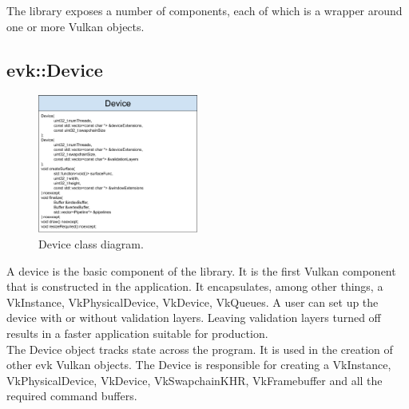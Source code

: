 \documentclass[12pt]{report}
\newcommand{\figurewidth}{0.55\textwidth}
\newcommand{\imagewidth}{0.47\textwidth}
\theoremstyle{definition}
\begin{document}
      The library exposes a number of components, each of which is a wrapper
      around one or more Vulkan objects.

      \subsection{evk::Device}

        \begin{figure}
          \centering
          \includegraphics[width=\imagewidth]{images/class_device.png}
          \caption{Device class diagram.}
          \label{fig:class_device}  
        \end{figure}

        A device is the basic component of the library. It is the first Vulkan
        component that is constructed in the application. It encapsulates,
        among other things, a VkInstance, VkPhysicalDevice, VkDevice, VkQueues.
        A user can set up the device with or without validation layers. Leaving
        validation layers turned off results in a faster application suitable
        for production. \\

        The Device object tracks state across the program. It is used in the
        creation of other evk Vulkan objects. The Device is responsible for
        creating a VkInstance, VkPhysicalDevice, VkDevice, VkSwapchainKHR, VkFramebuffer
        and all the required command buffers. \\
\end{document}
